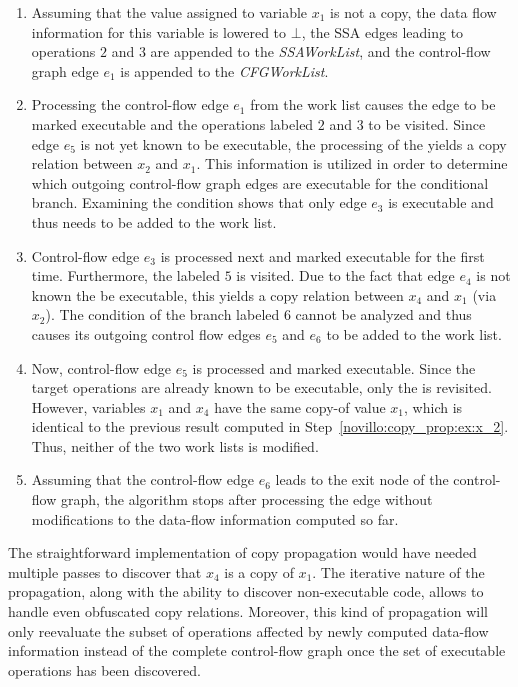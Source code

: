 \begin{enumerate}
\item Assuming that the value assigned to variable $x_1$ is not a copy, the data
flow information for this variable is lowered to $\bot$, the SSA edges leading to operations $2$ and $3$ are appended to the \emph{SSAWorkList}, and the control-flow graph edge $e_1$ is appended to the \emph{CFGWorkList}.
\item \label{novillo:copy_prop:ex:x_2} Processing the control-flow edge $e_1$ 
from the work list causes the edge to be marked executable and the operations labeled $2$ and $3$ to be visited. 
Since edge $e_5$ is not yet known to be executable, the processing of the \phifun yields a copy relation between $x_2$ and $x_1$. 
This information is utilized in order to determine which outgoing control-flow graph edges are executable for the conditional branch. 
Examining the condition shows that only edge $e_3$ is executable and thus needs to be added to the work list.
\item Control-flow edge $e_3$ is processed next and marked executable for the
first time. 
Furthermore, the \phifun labeled $5$ is visited. 
Due to the fact that edge $e_4$ is not known the be executable, this yields a copy relation between $x_4$ and $x_1$ (via $x_2$). 
The condition of the branch labeled $6$ cannot be analyzed and thus causes its outgoing control flow edges $e_5$ and $e_6$ to be added to the work list.
\item Now, control-flow edge $e_5$ is processed and marked executable. Since 
the target operations are already known to be executable, only the \phifun is revisited. 
However, variables $x_1$ and $x_4$ have the same copy-of value $x_1$, which is identical to the previous result computed in Step~\ref{novillo:copy_prop:ex:x_2}. 
Thus, neither of the two work lists is modified.
\item Assuming that the control-flow edge $e_6$ leads to the exit node of the
control-flow graph, the algorithm stops after processing the edge without modifications to the data-flow information computed so far.
\end{enumerate}

The straightforward implementation of copy propagation would have needed multiple passes to discover that $x_4$ is a copy of $x_1$. 
The iterative nature of the propagation, along with the ability to discover non-executable code, allows to handle even obfuscated copy relations. 
Moreover, this kind of propagation will only reevaluate the subset of operations affected by newly computed data-flow information instead of the complete control-flow graph once the set of executable operations has been discovered.

